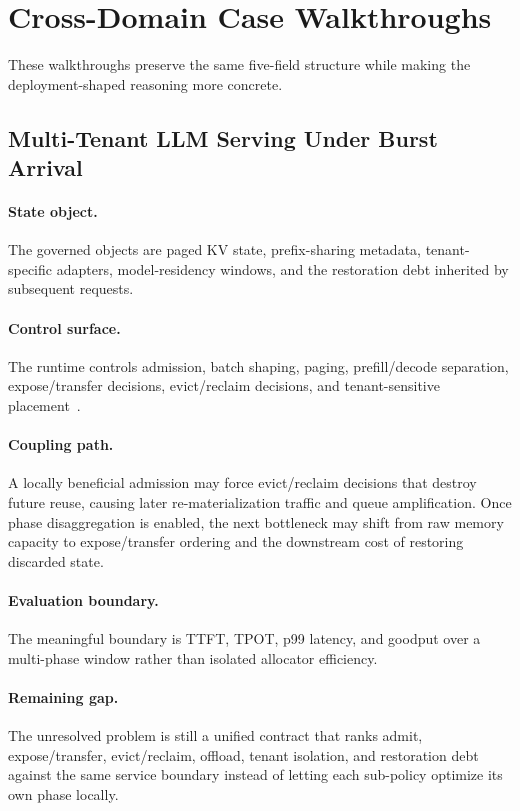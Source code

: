 \section{Cross-Domain Case Walkthroughs}

These walkthroughs preserve the same five-field structure while making the deployment-shaped reasoning more concrete.

\subsection{Multi-Tenant LLM Serving Under Burst Arrival}

\paragraph{State object.}
The governed objects are paged KV state, prefix-sharing metadata, tenant-specific adapters, model-residency windows, and the restoration debt inherited by subsequent requests.

\paragraph{Control surface.}
The runtime controls admission, batch shaping, paging, prefill/decode separation, expose/transfer decisions, evict/reclaim decisions, and tenant-sensitive placement~\cite{kwon2023pagedattention,agrawal2024sarathi,zhong2024distserve,patel2024splitwise,chen2024punica,nian2026cacheflow}.

\paragraph{Coupling path.}
A locally beneficial admission may force evict/reclaim decisions that destroy future reuse, causing later re-materialization traffic and queue amplification. Once phase disaggregation is enabled, the next bottleneck may shift from raw memory capacity to expose/transfer ordering and the downstream cost of restoring discarded state.

\paragraph{Evaluation boundary.}
The meaningful boundary is TTFT, TPOT, p99 latency, and goodput over a multi-phase window rather than isolated allocator efficiency.

\paragraph{Remaining gap.}
The unresolved problem is still a unified contract that ranks admit, expose/transfer, evict/reclaim, offload, tenant isolation, and restoration debt against the same service boundary instead of letting each sub-policy optimize its own phase locally.

